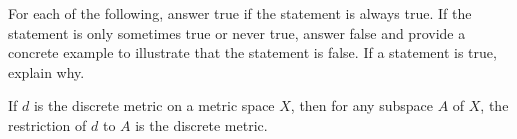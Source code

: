 \begin{comment}
Finally, 
\begin{align*}
d(x,z)^2 &=  \sum_{k=1}^{\infty} (x_k-z_k)^2   \\
	&= \sum_{k=1}^{\infty} (|x_k-z_k|)^2   \\
	&= \sum_{k=1}^{\infty} \left(|(x_k-y_k)+(y_k-z_k)|\right)^2 \\
	&\leq \sum_{k=1}^{\infty} \left(|x_k-y_k|+|y_k-z_k|\right)^2 \\
	&= \sum_{k=1}^{\infty} |x_k-y_k|^2 + 2|x_k-y_k| \ |y_k-z_k|+|y_k-z_k|^2 \\
	&= \sum_{k=1}^{\infty} (x_k-y_k)^2 + 2\sum_{k=1}^{\infty} |x_k-y_k| \ |y_k-z_k|+ \sum_{k=1}^{\infty} (y_k-z_k)^2 \\
	&\leq \sum_{k=1}^{\infty} (x_k-y_k)^2 +  \sum_{k=1}^{\infty} (y_k-z_k)^2 \\
	&\leq d(x,y)^2 + d(y,z)^2.
\end{align*}
Since all terms are non-negative we conclude that 
\[d(x,z) \leq \sqrt{d(x,y)^2 + d(y,z)^2} \leq d(x,y) + d(y,z).\]

\item Let $x = (x_n)$ and $y = (y_n)$ be in $E^m$ and assume that $f((x_n)) = f((y_n))$. Since $x$ and $y$ are in $E^m$, we know that $x_k = y_k = 0$ for $k > m$. The fact that $f((x_n)) = f((y_n))$ implies that $(x_n)_{n=1}^m = (y_n)_{n=1}^m$, so $x_n = y_n$ for $1 \leq n \leq m$. We conclude that $x=y$ and that $f$ is an injection. Now let $(z_n)_{n=1}^m$ be in $\R^m$ and let $z = (z_n)_{n=1}^{\infty}$ where $z_k = 0$ for $k > m$. Since there are only a finite number of non-zero terms in $z$, we know that $z \in H$. Thus, $z \in E^m$ and $f(z) = (z_n)_{n=1}^m$. Therefore, $f$ is a surjection and a bijection.

Using the fact that $x_k = y_k =0$ when $k > m$ we also see that 
\begin{align*}
d((x_n), (y_n)) &= \sum_{k=1}^{\infty} (x_k-z_k)^2  \\
	&= \sum_{k=1}^{m} (x_k-z_k)^2  \\
	&= d_E((x_n)_{n=1}^m, (y_n)_{n=1}^m) \\
	&= d_E(f((x_n)), f((y_n))).
\end{align*}
 
\ea

\end{comment}


\item For each of the following, answer true if the statement is always true. If the statement is only sometimes true or never true, answer false and provide a concrete example to illustrate that the statement is false. If a statement is true, explain why. 
	\ba
	\item If $d$ is the discrete metric on a metric space $X$, then for any subspace $A$ of $X$, the restriction of $d$ to $A$ is the discrete metric.
	
